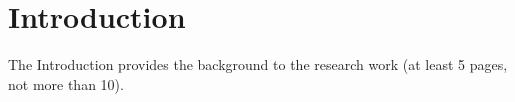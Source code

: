 \graphicspath{{chapters/02_introduction/}}
\chapter{Introduction}

The Introduction provides the background to the research work (at least 5 pages, not more
than 10).